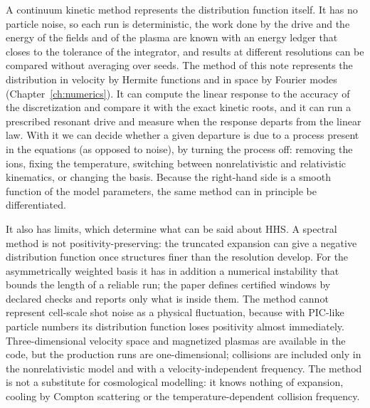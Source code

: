 A continuum kinetic method represents the distribution function itself. It has no particle noise, so each run is deterministic, the work done by the drive and the energy of the fields and of the plasma are known with an energy ledger that closes to the tolerance of the integrator, and results at different resolutions can be compared without averaging over seeds. The method of this note represents the distribution in velocity by Hermite functions and in space by Fourier modes (Chapter~\ref{ch:numerics}). It can compute the linear response to the accuracy of the discretization and compare it with the exact kinetic roots, and it can run a prescribed resonant drive and measure when the response departs from the linear law. With it we can decide whether a given departure is due to a process present in the equations (as opposed to noise), by turning the process off: removing the ions, fixing the temperature, switching between nonrelativistic and relativistic kinematics, or changing the basis. Because the right-hand side is a smooth function of the model parameters, the same method can in principle be differentiated.

It also has limits, which determine what can be said about HHS. A spectral method is not positivity-preserving: the truncated expansion can give a negative distribution function once structures finer than the resolution develop. For the asymmetrically weighted basis it has in addition a numerical instability that bounds the length of a reliable run; the paper defines certified windows by declared checks and reports only what is inside them. The method cannot represent cell-scale shot noise as a physical fluctuation, because with PIC-like particle numbers its distribution function loses positivity almost immediately. Three-dimensional velocity space and magnetized plasmas are available in the code, but the production runs are one-dimensional; collisions are included only in the nonrelativistic model and with a velocity-independent frequency. The method is not a substitute for cosmological modelling: it knows nothing of expansion, cooling by Compton scattering or the temperature-dependent collision frequency.

